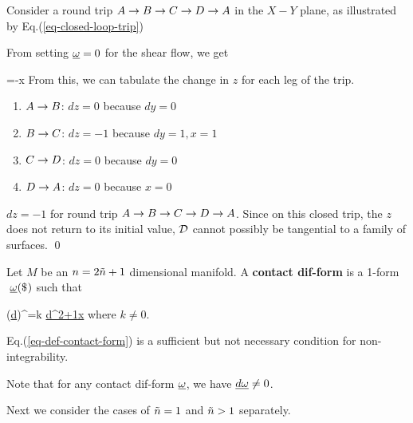 Consider a  round trip $A\rightarrow B\rightarrow C\rightarrow D
\rightarrow A$ in the $X-Y$ plane, as illustrated by Eq.(\ref{eq-closed-loop-trip})

\beq
{}
\label{eq-closed-loop-trip}
\eeq
From setting $\ul{\omega}=0$
for the shear flow, we get

\beq
{}=-x
\eeq
From this, we can tabulate
the change in $z$
for each leg of the trip.

\begin{enumerate}
\item $A\rightarrow B$:
$dz=0$ because $dy=0$

\item $B\rightarrow C$:
$dz=-1$ because $dy=1, x=1$

\item $C\rightarrow D$:
$dz=0$ because $dy=0$

\item $D\rightarrow A$:
$dz=0$ because $x=0$




\end{enumerate}

$dz=-1$ for round trip $A\rightarrow B\rightarrow C\rightarrow D\rightarrow A$.
Since on this closed trip,
the $z$ does not
return to its initial value,
${\cal D}$ cannot possibly be tangential to a family of surfaces.
\qed


Let $M$ be an $n=2{\tilde{n}}+1$ dimensional manifold.
A {\bf contact dif-form} is a 1-form $\pform{\omega}{}$
such that

\beq
\ul{\omega}\wedge
(\wedge \ul{d\omega})^\nn=k
\ul{d^{2\nn +1}x}
\label{eq-def-contact-form}
\eeq 
where $k\neq 0$.

Eq.(\ref{eq-def-contact-form})
is a sufficient
but not necessary condition for
non-integrability.

Note that for any contact dif-form
$\ul{\omega}$, we have  $\ul{d\omega}\neq 0$.



Next we consider the cases of ${\tilde{n}}=1$ and ${\tilde{n}}>1$ separately.


